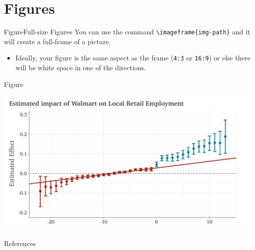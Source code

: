 \documentclass[aspectratio=169,t,11pt,table]{beamer}
\begin{document}
\section{Figures}


\begin{frame}{Figure}{Full-size Figures}
  You can use the command \texttt{\textbackslash imageframe\{img-path\}} and it will create a full-frame of a picture. 
  
  \begin{itemize}
  \item Ideally, your figure is the same aspect as the frame (\texttt{4:3} or \texttt{16:9}) or else there will be white space in one of the directions.
  \end{itemize}
\end{frame}

\begin{frame}{Figure}
  \begin{adjustbox}{width = 0.75\textwidth, center}
    \includegraphics{figures/plot_did2s_retail_slides.pdf}
  \end{adjustbox}
\end{frame}

\begin{frame}{References}
  \thispagestyle{empty}
  \printbibliography
\end{frame}
\appendix
\end{document}
